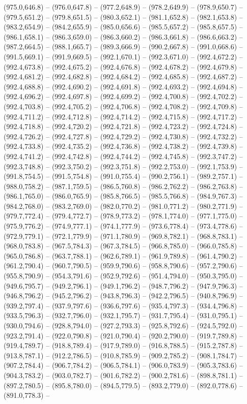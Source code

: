 (975.0,646.8) -- (976.0,647.8) -- (977.2,648.9) -- (978.2,649.9) -- (978.9,650.7) -- (979.5,651.2) -- (979.8,651.5) -- (980.3,652.1) -- (981.1,652.8) -- (982.1,653.8) -- (983.2,654.9) -- (984.2,655.9) -- (985.0,656.6) -- (985.5,657.2) -- (985.8,657.5) -- (986.1,658.1) -- (986.3,659.0) -- (986.3,660.2) -- (986.3,661.8) -- (986.6,663.2) -- (987.2,664.5) -- (988.1,665.7) -- (989.3,666.9) -- (990.2,667.8) -- (991.0,668.6) -- (991.5,669.1) -- (991.9,669.5) -- (992.1,670.1) -- (992.3,671.0) -- (992.4,672.2) -- (992.4,673.8) -- (992.4,675.2) -- (992.4,676.8) -- (992.4,678.2) -- (992.4,679.8) -- (992.4,681.2) -- (992.4,682.8) -- (992.4,684.2) -- (992.4,685.8) -- (992.4,687.2) -- (992.4,688.8) -- (992.4,690.2) -- (992.4,691.8) -- (992.4,693.2) -- (992.4,694.8) -- (992.4,696.2) -- (992.4,697.8) -- (992.4,699.2) -- (992.4,700.8) -- (992.4,702.2) -- (992.4,703.8) -- (992.4,705.2) -- (992.4,706.8) -- (992.4,708.2) -- (992.4,709.8) -- (992.4,711.2) -- (992.4,712.8) -- (992.4,714.2) -- (992.4,715.8) -- (992.4,717.2) -- (992.4,718.8) -- (992.4,720.2) -- (992.4,721.8) -- (992.4,723.2) -- (992.4,724.8) -- (992.4,726.2) -- (992.4,727.8) -- (992.4,729.2) -- (992.4,730.8) -- (992.4,732.2) -- (992.4,733.8) -- (992.4,735.2) -- (992.4,736.8) -- (992.4,738.2) -- (992.4,739.8) -- (992.4,741.2) -- (992.4,742.8) -- (992.4,744.2) -- (992.4,745.8) -- (992.3,747.2) -- (992.3,748.8) -- (992.3,750.2) -- (992.3,751.8) -- (992.2,753.0) -- (992.1,753.9) -- (991.8,754.5) -- (991.5,754.8) -- (991.0,755.4) -- (990.2,756.1) -- (989.2,757.1) -- (988.0,758.2) -- (987.1,759.5) -- (986.5,760.8) -- (986.2,762.2) -- (986.2,763.8) -- (986.1,765.0) -- (986.0,765.9) -- (985.8,766.5) -- (985.5,766.8) -- (984.9,767.3) -- (984.2,768.0) -- (983.2,769.0) -- (982.0,770.2) -- (981.0,771.2) -- (980.2,771.9) -- (979.7,772.4) -- (979.4,772.7) -- (978.9,773.2) -- (978.1,774.0) -- (977.1,775.0) -- (975.9,776.2) -- (974.9,777.1) -- (974.1,777.9) -- (973.6,778.4) -- (973.4,778.6) -- (972.9,779.1) -- (972.1,779.9) -- (971.1,780.9) -- (969.8,782.1) -- (968.8,783.1) -- (968.0,783.8) -- (967.5,784.3) -- (967.3,784.5) -- (966.8,785.0) -- (966.0,785.8) -- (965.0,786.8) -- (963.7,788.1) -- (962.6,789.1) -- (961.9,789.8) -- (961.4,790.2) -- (961.2,790.4) -- (960.7,790.5) -- (959.9,790.6) -- (958.8,790.6) -- (957.2,790.6) -- (955.8,790.9) -- (954.3,791.6) -- (952.9,792.6) -- (951.4,794.0) -- (950.3,795.0) -- (949.6,795.7) -- (949.2,796.1) -- (949.1,796.2) -- (948.7,796.2) -- (947.9,796.3) -- (946.8,796.2) -- (945.2,796.2) -- (943.8,796.3) -- (942.2,796.5) -- (940.8,796.9) -- (939.2,797.4) -- (937.9,797.6) -- (936.6,797.6) -- (935.4,797.3) -- (934.4,796.8) -- (933.5,796.3) -- (932.7,796.0) -- (932.1,795.7) -- (931.7,795.4) -- (931.0,795.1) -- (930.0,794.6) -- (928.8,794.0) -- (927.2,793.3) -- (925.8,792.6) -- (924.5,792.0) -- (923.2,791.4) -- (922.0,790.8) -- (921.0,790.4) -- (920.2,790.0) -- (919.7,789.8) -- (919.4,789.7) -- (918.8,789.4) -- (917.9,789.0) -- (916.8,788.5) -- (915.2,787.8) -- (913.8,787.1) -- (912.2,786.5) -- (910.8,785.9) -- (909.2,785.2) -- (908.1,784.7) -- (907.2,784.4) -- (906.7,784.2) -- (906.5,784.1) -- (906.0,783.9) -- (905.3,783.6) -- (904.3,783.2) -- (903.0,782.7) -- (901.6,782.2) -- (900.2,781.6) -- (898.8,781.1) -- (897.2,780.5) -- (895.8,780.0) -- (894.5,779.5) -- (893.2,779.0) -- (892.0,778.6) -- (891.0,778.3) -- 